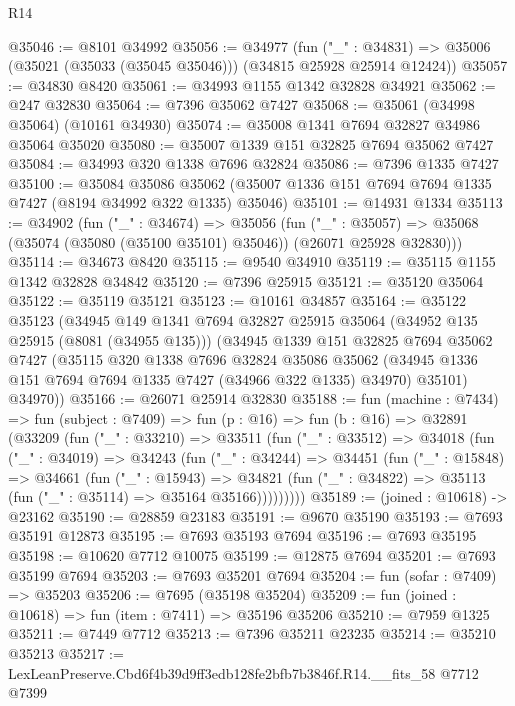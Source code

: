\begin{lexlean}{R14}
\begin{coremodule}
@35046 := @8101 @34992
@35056 := @34977
    (fun ("_" : @34831) => @35006 (@35021 (@35033 (@35045 @35046))) (@34815 @25928 @25914 @12424))
@35057 := @34830 @8420
@35061 := @34993 @1155 @1342 @32828 @34921
@35062 := @247 @32830
@35064 := @7396 @35062 @7427
@35068 := @35061 (@34998 @35064) (@10161 @34930)
@35074 := @35008 @1341 @7694 @32827 @34986 @35064 @35020
@35080 := @35007 @1339 @151 @32825 @7694 @35062 @7427
@35084 := @34993 @320 @1338 @7696 @32824
@35086 := @7396 @1335 @7427
@35100 := @35084
    @35086
    @35062
    (@35007 @1336 @151 @7694 @7694 @1335 @7427 (@8194 @34992 @322 @1335) @35046)
@35101 := @14931 @1334
@35113 := @34902
    (fun ("_" : @34674) =>
    @35056
      (fun ("_" : @35057) =>
      @35068 (@35074 (@35080 (@35100 @35101) @35046)) (@26071 @25928 @32830)))
@35114 := @34673 @8420
@35115 := @9540 @34910
@35119 := @35115 @1155 @1342 @32828 @34842
@35120 := @7396 @25915
@35121 := @35120 @35064
@35122 := @35119 @35121
@35123 := @10161 @34857
@35164 := @35122
    @35123
    (@34945
      @149
      @1341
      @7694
      @32827
      @25915
      @35064
      (@34952 @135 @25915 (@8081 (@34955 @135)))
      (@34945
        @1339
        @151
        @32825
        @7694
        @35062
        @7427
        (@35115
          @320
          @1338
          @7696
          @32824
          @35086
          @35062
          (@34945 @1336 @151 @7694 @7694 @1335 @7427 (@34966 @322 @1335) @34970)
          @35101)
        @34970))
@35166 := @26071 @25914 @32830
@35188 := fun (machine : @7434) =>
  fun (subject : @7409) =>
  fun (p : @16) =>
  fun (b : @16) =>
  @32891
    (@33209
      (fun ("_" : @33210) =>
      @33511
        (fun ("_" : @33512) =>
        @34018
          (fun ("_" : @34019) =>
          @34243
            (fun ("_" : @34244) =>
            @34451
              (fun ("_" : @15848) =>
              @34661
                (fun ("_" : @15943) =>
                @34821 (fun ("_" : @34822) => @35113 (fun ("_" : @35114) => @35164 @35166)))))))))
@35189 := (joined : @10618) -> @23162
@35190 := @28859 @23183
@35191 := @9670 @35190
@35193 := @7693 @35191 @12873
@35195 := @7693 @35193 @7694
@35196 := @7693 @35195
@35198 := @10620 @7712 @10075
@35199 := @12875 @7694
@35201 := @7693 @35199 @7694
@35203 := @7693 @35201 @7694
@35204 := fun (sofar : @7409) => @35203
@35206 := @7695 (@35198 @35204)
@35209 := fun (joined : @10618) => fun (item : @7411) => @35196 @35206
@35210 := @7959 @1325
@35211 := @7449 @7712
@35213 := @7396 @35211 @23235
@35214 := @35210 @35213
@35217 := LexLeanPreserve.Cbd6f4b39d9ff3edb128fe2bfb7b3846f.R14.__fits_58 @7712 @7399

\end{coremodule}
\end{lexlean}
